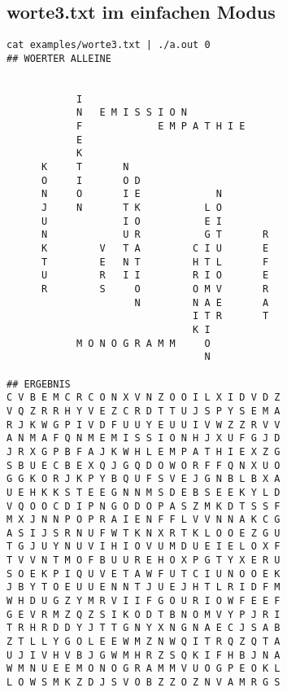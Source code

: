 \documentclass[a4paper,10pt,ngerman]{scrartcl}
\begin{document}
\subsection*{worte3.txt im einfachen Modus}
\begin{lstlisting}
cat examples/worte3.txt | ./a.out 0
## WOERTER ALLEINE
                                               
                                               
            I                                  
            N   E M I S S I O N                
            F             E M P A T H I E      
            E                                  
            K                                  
      K     T       N                          
      O     I       O D                        
      N     O       I E             N          
      J     N       T K           L O          
      U             I O           E I          
      N             U R           G T       R  
      K         V   T A         C I U       E  
      T         E   N T         H T L       F  
      U         R   I I         R I O       E  
      R         S     O         O M V       R  
                      N         N A E       A  
                                I T R       T  
                                K I            
            M O N O G R A M M     O            
                                  N            

## ERGEBNIS
C V B E M C R C O N X V N Z O O I L X I D V D Z
V Q Z R R H Y V E Z C R D T T U J S P Y S E M A
R J K W G P I V D F U U Y E U U I V W Z Z R V V
A N M A F Q N M E M I S S I O N H J X U F G J D
J R X G P B F A J K W H L E M P A T H I E X Z G
S B U E C B E X Q J G Q D O W O R F F Q N X U O
G G K O R J K P Y B Q U F S V E J G N B L B X A
U E H K K S T E E G N N M S D E B S E E K Y L D
V Q O O C D I P N G O D O P A S Z M K D T S S F
M X J N N P O P R A I E N F F L V V N N A K C G
A S I J S R N U F W T K N X R T K L O O E Z G U
T G J U Y N U V I H I O V U M D U E I E L O X F
T V V N T M O F B U U R E H O X P G T Y X E R U
S O E K P I Q U V E T A W F U T C I U N O O E K
J B Y T O E U U E N N T J U E J H T L R I D F M
W H D U G Z Y M R V I I F G O U R I O W F E E F
G E V R M Z Q Z S I K O D T B N O M V Y P J R I
T R H R D D Y J T T G N Y X N G N A E C J S A B
Z T L L Y G O L E E W M Z N W Q I T R Q Z Q T A
U J I V H V B J G W M H R Z S Q K I F H B J N A
W M N U E E M O N O G R A M M V U O G P E O K L
L O W S M K Z D J S V O B Z Z O Z N V A M R G S
\end{lstlisting}
\end{document}
